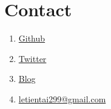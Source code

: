 \section*{Contact}
\begin{enumerate}
  \item \href{https://github.com/letientai299}{Github}
  \item \href{https://twitter.com/letientai299}{Twitter}
  \item \href{https://letientai299.github.io}{Blog}
  \item \href{mailto:letientai299@gmail.com}{letientai299@gmail.com}
\end{enumerate}
